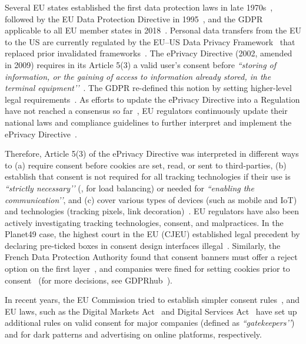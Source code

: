 \label{sec:eu-regulations}
Several EU states established the first data protection laws in late 1970s~\cite{LoiNdeg78171978,GermanDP-1977,NorwayDP-1978}, followed by the EU Data Protection Directive in 1995~\cite{Directive199546EC}, and the GDPR applicable to all EU member states in 2018~\cite{Regulation2016679}.  
%
Personal data transfers from the EU to the US are currently regulated by the EU–US Data Privacy Framework~\cite{EU-US-DP-2023} that replaced prior invalidated frameworks~\cite{PrivacyShield-2016,Schrems-II,SafeHarbor-2000,Schrems-I}.
%
The ePrivacy Directive (2002, amended in 2009) requires in its Article 5(3) a valid user’s consent before \textit{``storing of information, or the gaining of access to information already stored, in the terminal equipment’’}~\cite{Directive2002582002,Directive20091362009}. The GDPR re-defined this notion by setting higher-level legal requirements~\cite{santosAreCookieBanners2020}. As efforts to update the ePrivacy Directive into a Regulation have not reached a consensus so far~\cite{europeancommissionProposalEPrivacyRegulation2024}, EU regulators continuously update their national laws and compliance guidelines to further interpret and implement the ePrivacy Directive~\cite{Bielova2024-zr}.

Therefore, Article 5(3) of the ePrivacy Directive was interpreted in different ways to (a) require consent before cookies are set, read, or sent to third-parties, (b) establish that consent is not required for all tracking technologies if their use is \textit{``strictly necessary’’} (\eg{}, for load balancing) or needed for \textit{``enabling the communication’’}, and (c) cover various types of devices (such as mobile and IoT) and technologies (tracking pixels, link decoration)~\cite{Guidelines22023}. 
%
EU regulators have also been actively investigating tracking technologies, consent, and malpractices. In the Planet49 case, the highest court in the EU (CJEU) established legal precedent by declaring pre-ticked boxes in consent design interfaces illegal~\cite{CJEUC67317}. Similarly, the French Data Protection Authority found that consent banners must offer a reject option on the first layer~\cite{ClosureInjunctionIssued2023,CNILFranceSAN2021024}, and companies were fined for setting cookies prior to consent~\cite{CNILFranceSAN2020012,DeliberationSAN20200127} (for more decisions, see GDPRhub~\cite{GDPRhub}).

In recent years, the EU Commission %
tried to establish simpler consent rules~\cite{europeancommissionCookiePledgeEuropean2023}, and EU laws, such as the Digital Markets Act~\cite{RegulationEU20222022} and Digital Services Act~\cite{RegulationEU20222022a} have set up additional rules on valid consent for major companies (defined as \textit{``gatekeepers’’}) and for dark patterns and advertising on online platforms, respectively.

